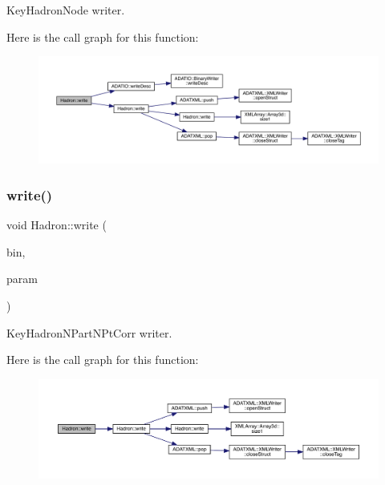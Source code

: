 Key\+Hadron\+Node writer. 

Here is the call graph for this function\+:
\nopagebreak
\begin{figure}[H]
\begin{center}
\leavevmode
\includegraphics[width=350pt]{d1/daf/namespaceHadron_ae47780c59de1d15679cc11611947b313_cgraph}
\end{center}
\end{figure}
\mbox{\label{namespaceHadron_aef02c5c2c485a766d9e66d0dabe73f62}} 
\subsubsection{\texorpdfstring{write()}{write()}\hspace{0.1cm}{\footnotesize\ttfamily [53/95]}}
{\footnotesize\ttfamily void Hadron\+::write (\begin{DoxyParamCaption}\item[{\mbox{\hyperlink{classADATIO_1_1BinaryWriter}{Binary\+Writer}} \&}]{bin,  }\item[{const \mbox{\hyperlink{structHadron_1_1KeyHadronNPartNPtCorr__t_1_1NPoint__t}{Key\+Hadron\+N\+Part\+N\+Pt\+Corr\+\_\+t\+::\+N\+Point\+\_\+t}} \&}]{param }\end{DoxyParamCaption})}



Key\+Hadron\+N\+Part\+N\+Pt\+Corr writer. 

Here is the call graph for this function\+:
\nopagebreak
\begin{figure}[H]
\begin{center}
\leavevmode
\includegraphics[width=350pt]{d1/daf/namespaceHadron_aef02c5c2c485a766d9e66d0dabe73f62_cgraph}
\end{center}
\end{figure}
\mbox{\label{namespaceHadron_ac78ff88ef705b3eaa48d7d440fe2a299}} 

